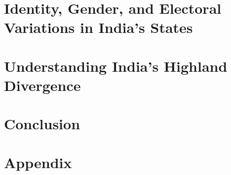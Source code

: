 \documentclass[11pt]{book}
\begin{document}
\chapter{Identity, Gender, and Electoral Variations in India's States}
\label{ch:ch1}


\chapter{ Understanding India's Highland Divergence}
\label{ch:ch2}


\chapter{Conclusion}
\label{ch:conc}



\printbibliography %
\chapter*{Appendix}
\label{ch:appendix}

\end{document}
